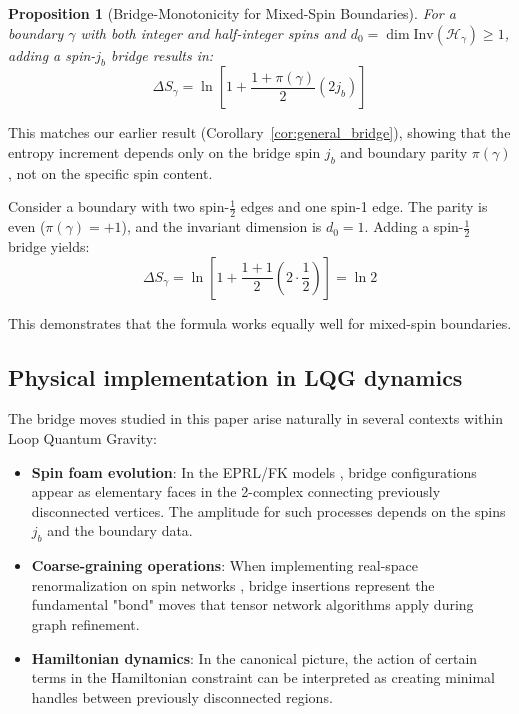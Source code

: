 \documentclass[11pt, a4paper]{article}
\theoremstyle{plain}
\newtheorem{proposition}[theorem]{Proposition}
\theoremstyle{definition}
\theoremstyle{remark}
\newcommand{\Inv}{\mathrm{Inv}}
\begin{document}
\begin{proposition}[Bridge-Monotonicity for Mixed-Spin Boundaries]
\label{prop:mixed_spin}
For a boundary $\gamma$ with both integer and half-integer spins and $d_0 = \dim\Inv(\mathcal{H}_{\gamma}) \geq 1$, adding a spin-$j_b$ bridge results in:
\begin{equation}
\Delta S_{\gamma} = \ln\left[1 + \frac{1+\pi(\gamma)}{2}(2j_b)\right]
\end{equation}
\end{proposition}

This matches our earlier result (Corollary~\ref{cor:general_bridge}), showing that the entropy increment depends only on the bridge spin $j_b$ and boundary parity $\pi(\gamma)$, not on the specific spin content.

\begin{example}
Consider a boundary with two spin-$\frac{1}{2}$ edges and one spin-1 edge. The parity is even ($\pi(\gamma)=+1$), and the invariant dimension is $d_0=1$. Adding a spin-$\frac{1}{2}$ bridge yields:
\begin{equation}
\Delta S_{\gamma} = \ln\left[1 + \frac{1+1}{2}(2\cdot\frac{1}{2})\right] = \ln 2
\end{equation}

This demonstrates that the formula works equally well for mixed-spin boundaries.
\end{example}

\subsection{Physical implementation in LQG dynamics}
\label{sec:lqg_dynamics}

The bridge moves studied in this paper arise naturally in several contexts within Loop Quantum Gravity:

\begin{itemize}
\item \textbf{Spin foam evolution}: In the EPRL/FK models \cite{EnglePereira2008,FreidelKrasnov2008}, bridge configurations appear as elementary faces in the 2-complex connecting previously disconnected vertices. The amplitude for such processes depends on the spins $j_b$ and the boundary data.

\item \textbf{Coarse-graining operations}: When implementing real-space renormalization on spin networks \cite{DittrichReview2014,OritiCG2014}, bridge insertions represent the fundamental "bond" moves that tensor network algorithms apply during graph refinement.

\item \textbf{Hamiltonian dynamics}: In the canonical picture, the action of certain terms in the Hamiltonian constraint \cite{ThiemannQSD1998} can be interpreted as creating minimal handles between previously disconnected regions.
\end{itemize}
\end{document}

